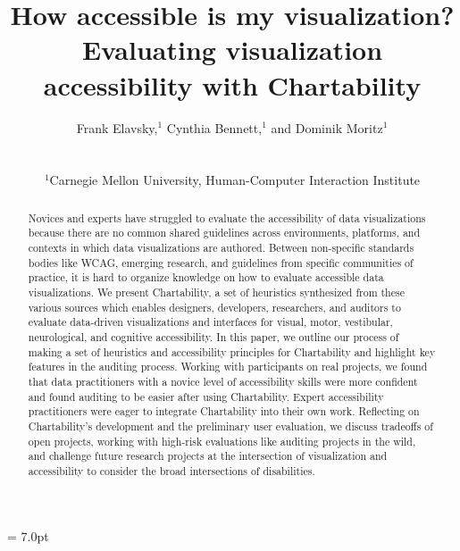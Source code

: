 \documentclass{egpubl}
\title[Chartability]%
      {How accessible is my visualization? Evaluating visualization accessibility with Chartability}
\author[F. Elavsky, C. Bennett, \& D. Moritz]
{\parbox{\textwidth}{\centering Frank Elavsky,$^{1}$\orcid{0000-0002-6849-5893}
        Cynthia Bennett,$^{1}$
        and Dominik Moritz$^{1}$\orcid{0000-0002-3110-1053}
        }
        \\
{\parbox{\textwidth}{\centering $^1$Carnegie Mellon University, Human-Computer Interaction Institute\\
       } 
}
}
\begin{document}
\tabcolsep = 7.0pt
\def\arraystretch{0.8}


\maketitle
\begin{abstract}
Novices and experts have struggled to evaluate the accessibility of data visualizations because there are no common shared guidelines across environments, platforms, and contexts in which data visualizations are authored. Between non-specific standards bodies like WCAG, emerging research, and guidelines from specific communities of practice, it is hard to organize knowledge on how to evaluate accessible data visualizations. We present Chartability, a set of heuristics synthesized from these various sources which enables designers, developers, researchers, and auditors to evaluate data-driven visualizations and interfaces for visual, motor, vestibular, neurological, and cognitive accessibility. In this paper, we outline our process of making a set of heuristics and accessibility principles for Chartability and highlight key features in the auditing process. Working with participants on real projects, we found that data practitioners with a novice level of accessibility skills were more confident and found auditing to be easier after using Chartability. Expert accessibility practitioners were eager to integrate Chartability into their own work. Reflecting on Chartability’s development and the preliminary user evaluation, we discuss tradeoffs of open projects, working with high-risk evaluations like auditing projects in the wild, and challenge future research projects at the intersection of visualization and accessibility to consider the broad intersections of disabilities.


\end{abstract}
\end{document}
